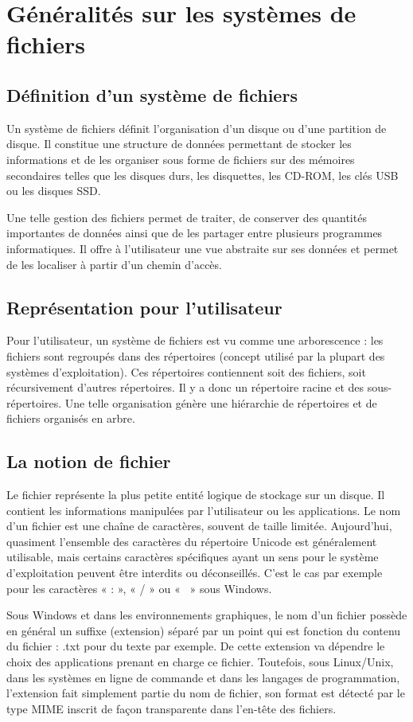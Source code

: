 \chapter{Généralités sur les systèmes de fichiers}
	\section{Définition d'un système de fichiers}
Un système de fichiers définit l'organisation d'un disque ou d'une partition de disque. Il constitue une structure de données permettant de stocker les informations et de les organiser sous forme de fichiers sur des mémoires secondaires telles que les disques durs, les disquettes, les CD-ROM, les clés USB ou les disques SSD.

Une telle gestion des fichiers permet de traiter, de conserver des quantités importantes de données ainsi que de les partager entre plusieurs programmes informatiques. Il offre à l'utilisateur une vue abstraite sur ses données et permet de les localiser à partir d'un chemin d'accès.

	\section{Représentation pour l'utilisateur}
Pour l'utilisateur, un système de fichiers est vu comme une arborescence : les fichiers sont regroupés dans des répertoires (concept utilisé par la plupart des systèmes d’exploitation). Ces répertoires contiennent soit des fichiers, soit récursivement d'autres répertoires. Il y a donc un répertoire racine et des sous-répertoires. Une telle organisation génère une hiérarchie de répertoires et de fichiers organisés en arbre.

	\section{La notion de fichier}
Le fichier représente la plus petite entité logique de stockage sur un disque. Il contient les informations manipulées par l'utilisateur ou les applications. Le nom d'un fichier est une chaîne de caractères, souvent de taille limitée. Aujourd'hui, quasiment l'ensemble des caractères du répertoire Unicode est généralement utilisable, mais certains caractères spécifiques ayant un sens pour le système d'exploitation peuvent être interdits ou déconseillés. C'est le cas par exemple pour les caractères « : », « / » ou « \ » sous Windows.
\par Sous Windows et dans les environnements graphiques, le nom d'un fichier possède en général un suffixe (extension) séparé par un point qui est fonction du contenu du fichier : .txt pour du texte par exemple. De cette extension va dépendre le choix des applications prenant en charge ce fichier. Toutefois, sous Linux/Unix, dans les systèmes en ligne de commande et dans les langages de programmation, l'extension fait simplement partie du nom de fichier, son format est détecté par le type MIME inscrit de façon transparente dans l'en-tête des fichiers.